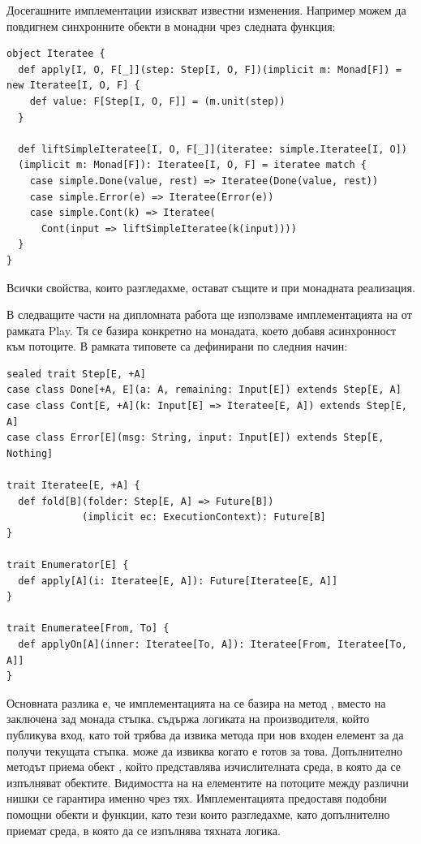 Досегашните имплементации изискват известни изменения. Например можем да повдигнем синхронните  обекти в монадни чрез следната функция:

\begin{lstlisting}
object Iteratee {
  def apply[I, O, F[_]](step: Step[I, O, F])(implicit m: Monad[F]) = new Iteratee[I, O, F] {
    def value: F[Step[I, O, F]] = (m.unit(step))
  }
  
  def liftSimpleIteratee[I, O, F[_]](iteratee: simple.Iteratee[I, O])
  (implicit m: Monad[F]): Iteratee[I, O, F] = iteratee match {
    case simple.Done(value, rest) => Iteratee(Done(value, rest))
    case simple.Error(e) => Iteratee(Error(e))
    case simple.Cont(k) => Iteratee(
      Cont(input => liftSimpleIteratee(k(input))))
  }
}
\end{lstlisting}

Всички свойства, които разгледахме, остават същите и при монадната реализация.

В следващите части на дипломната работа ще използваме имплементацията на  от рамката Play. Тя се базира конкретно на  монадата, което добавя асинхронност към потоците. В рамката типовете са дефинирани по следния начин:

\begin{lstlisting}
sealed trait Step[E, +A]
case class Done[+A, E](a: A, remaining: Input[E]) extends Step[E, A]
case class Cont[E, +A](k: Input[E] => Iteratee[E, A]) extends Step[E, A]
case class Error[E](msg: String, input: Input[E]) extends Step[E, Nothing]

trait Iteratee[E, +A] {
  def fold[B](folder: Step[E, A] => Future[B])
             (implicit ec: ExecutionContext): Future[B]
}

trait Enumerator[E] {
  def apply[A](i: Iteratee[E, A]): Future[Iteratee[E, A]]
}

trait Enumeratee[From, To] {
  def applyOn[A](inner: Iteratee[To, A]): Iteratee[From, Iteratee[To, A]]
}
\end{lstlisting}

Основната разлика е, че имплементацията на  се базира на метод , вместо на заключена зад монада стъпка.  съдържа логиката на производителя, който публикува вход, като той трябва да извика  метода при нов входен елемент за да получи текущата стъпка.  може да извиква  когато е готов за това. Допълнително методът приема обект , който представлява изчислителната среда, в която да се изпълняват  обектите. Видимостта на на елементите на потоците между различни нишки се гарантира именно чрез тях. Имплементацията предоставя подобни помощни обекти и функции, като тези които разгледахме, като допълнително приемат среда, в която да се изпълнява тяхната логика.

